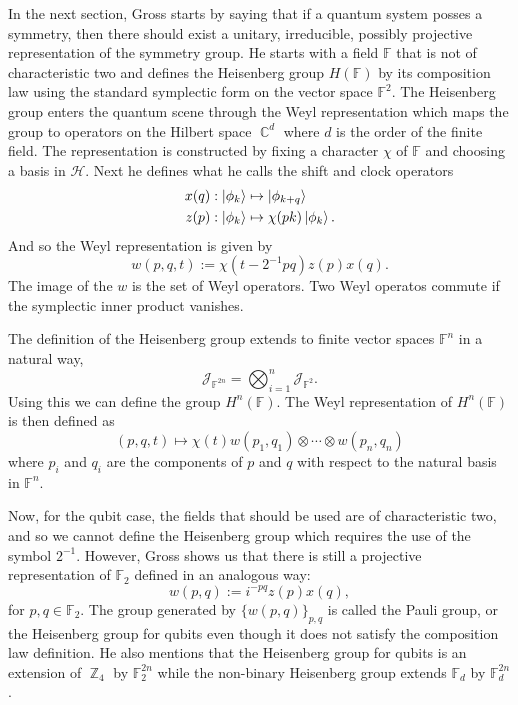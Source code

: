 \documentclass[a4paper]{article}
\DeclareMathOperator{\C}{\mathbb{C}}
\DeclareMathOperator{\Z}{\mathbb{Z}}
\begin{document}
  In the next section, Gross starts by saying that if a
  quantum system posses a symmetry, then there should exist
  a unitary, irreducible, possibly projective representation
  of the symmetry group. He starts with a field $\mathbb F$ 
  that is not of characteristic two and defines the
  Heisenberg group $H(\mathbb F)$ by its composition law
  using the standard symplectic form on the vector space
  $\mathbb F^2$. The Heisenberg group enters the quantum
  scene through the Weyl representation which maps the group
  to operators on the Hilbert space $\C^{d}$ where $d$ is
  the order of the finite field. The representation is
  constructed by fixing a character $\chi$ of $\mathbb F$ 
  and choosing a basis in $\mathcal H$. Next he defines what
  he calls the shift and clock operators
  \begin{align*}
    x(q) &: \ket{\phi_k} \mapsto \ket{\phi_{k+q}} \\
    z(p) &: \ket{\phi_k} \mapsto \chi(pk) \ket{\phi_k}.
  \end{align*} 
  And so the Weyl representation is given by
  \[
    w(p,q,t) := \chi(t - 2^{-1}pq) z(p)x(q).
  \] 
  The image of the $w$ is the set of Weyl operators. Two
  Weyl operatos commute if the symplectic inner product
  vanishes. 

  The definition of the Heisenberg group extends to finite
  vector spaces $\mathbb F^{n}$ in a natural way,
  \[
    \mathcal J_{\mathbb F^{2n}} = \bigotimes_{i=1}^{n}
    \mathcal J_{\mathbb F^2}.
  \] 
  Using this we can define the group $H^{n}(\mathbb F)$. The
  Weyl representation of $H^{n}(\mathbb F)$ is then defined
  as
  \[
    (p,q,t)
    \mapsto
    \chi(t)w(p_1,q_1) \otimes \cdots \otimes w(p_n,q_n)
  \] 
  where $p_i$ and $q_i$ are the components of $p$ and $q$ 
  with respect to the natural basis in $\mathbb F^{n}$.

  Now, for the qubit case, the fields that should be used
  are of characteristic two, and so we cannot define the
  Heisenberg group which requires the use of the symbol
  $2^{-1}$. However, Gross shows us that there is still a
  projective representation of $\mathbb F_2$ defined in an
  analogous way:
  \[
    w(p,q) := i^{-pq}z(p)x(q),
  \] 
  for $p,q \in \mathbb F_2$. The group generated by
  $\{w(p,q)\}_{p,q}$ is called the Pauli group, or the
  Heisenberg group for qubits even though it does not
  satisfy the composition law definition. He also mentions
  that the Heisenberg group for qubits is an extension of
  $\Z_4$ by $\mathbb F_2^{2n}$ while the non-binary
  Heisenberg group extends $\mathbb F_d$ by $\mathbb
  F_d^{2n}$.
\end{document}
